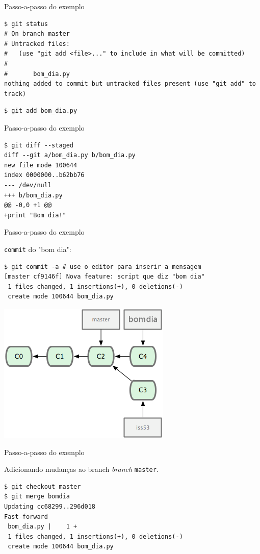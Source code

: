 \documentclass[portuguese,brazil]{beamer}
\begin{document}
\begin{frame}[fragile]{Passo-a-passo do exemplo}
\begin{verbatim}
$ git status
# On branch master
# Untracked files:
#   (use "git add <file>..." to include in what will be committed)
#
#       bom_dia.py
nothing added to commit but untracked files present (use "git add" to track)
\end{verbatim}
\pause
\begin{verbatim}
$ git add bom_dia.py
\end{verbatim}
\end{frame}

\begin{frame}[fragile]{Passo-a-passo do exemplo}
\begin{verbatim}
$ git diff --staged
diff --git a/bom_dia.py b/bom_dia.py
new file mode 100644
index 0000000..b62bb76
--- /dev/null
+++ b/bom_dia.py
@@ -0,0 +1 @@
+print "Bom dia!"
\end{verbatim}
\end{frame}

\begin{frame}[fragile]{Passo-a-passo do exemplo}
\begin{center}
\texttt{commit} do "bom dia":
\end{center}
\pause
\begin{verbatim}
$ git commit -a # use o editor para inserir a mensagem
[master cf9146f] Nova feature: script que diz "bom dia"
 1 files changed, 1 insertions(+), 0 deletions(-)
 create mode 100644 bom_dia.py
\end{verbatim}
\pause
\begin{center}
  \includegraphics{images/commitbomdia.png}
\end{center}
\end{frame}

\begin{frame}[fragile]{Passo-a-passo do exemplo}
\begin{center}
Adicionando mudanças ao branch \textit{branch} \texttt{master}.
\end{center}
\pause
\begin{verbatim}
$ git checkout master
$ git merge bomdia
Updating cc68299..296d018
Fast-forward
 bom_dia.py |    1 +
 1 files changed, 1 insertions(+), 0 deletions(-)
 create mode 100644 bom_dia.py
\end{verbatim}
\end{frame}
\end{document}

